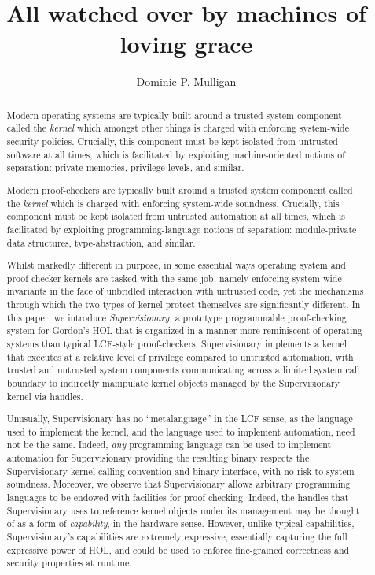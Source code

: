 \documentclass[a4paper, UKenglish, cleveref, autoref, thm-restate]{lipics-v2021}
\title{All watched over by machines of loving grace}
\author{Dominic P. Mulligan}{Automated Reasoning Group, Amazon Web Services, Cambridge, United Kingdom\footnote{All work done whilst employed within the Systems Research Group, Arm Research, Cambridge} \and \url{www.dominic-mulligan.co.uk}}{dominic.p.mulligan@gmail.com}{}{}
\begin{document}
\maketitle

\begin{abstract}
Modern operating systems are typically built around a trusted system component called the \emph{kernel} which amongst other things is charged with enforcing system-wide security policies.
Crucially, this component must be kept isolated from untrusted software at all times, which is facilitated by exploiting machine-oriented notions of separation: private memories, privilege levels, and similar.

Modern proof-checkers are typically built around a trusted system component called the \emph{kernel} which is charged with enforcing system-wide soundness.
Crucially, this component must be kept isolated from untrusted automation at all times, which is facilitated by exploiting programming-language notions of separation: module-private data structures, type-abstraction, and similar.

Whilst markedly different in purpose, in some essential ways operating system and proof-checker kernels are tasked with the same job, namely enforcing system-wide invariants in the face of unbridled interaction with untrusted code, yet the mechanisms through which the two types of kernel protect themselves are significantly different.
In this paper, we introduce \emph{Supervisionary}, a prototype programmable proof-checking system for Gordon's HOL that is organized in a manner more reminiscent of operating systems than typical LCF-style proof-checkers.
Supervisionary implements a kernel that executes at a relative level of privilege compared to untrusted automation, with trusted and untrusted system components communicating across a limited system call boundary to indirectly manipulate kernel objects managed by the Supervisionary kernel via handles.

Unusually, Supervisionary has no ``metalanguage'' in the LCF sense, as the language used to implement the kernel, and the language used to implement automation, need not be the same.
Indeed, \emph{any} programming language can be used to implement automation for Supervisionary providing the resulting binary respects the Supervisionary kernel calling convention and binary interface, with no risk to system soundness.
Moreover, we observe that Supervisionary allows arbitrary programming languages to be endowed with facilities for proof-checking.
Indeed, the handles that Supervisionary uses to reference kernel objects under its management may be thought of as a form of \emph{capability}, in the hardware sense.
However, unlike typical capabilities, Supervisionary's capabilities are extremely expressive, essentially capturing the full expressive power of HOL, and could be used to enforce fine-grained correctness and security properties at runtime.
\end{abstract}
\end{document}
